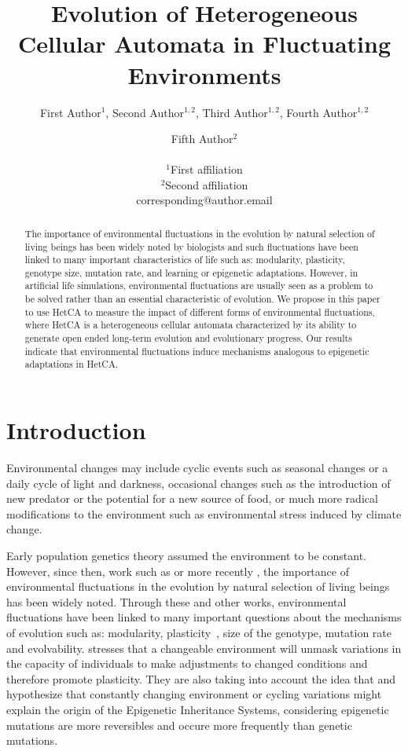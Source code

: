 \documentclass[letterpaper]{article}
\title{Evolution of Heterogeneous Cellular Automata in Fluctuating Environments}
\author{First Author$^{1}$, Second Author$^{1,2}$, Third Author$^{1,2}$, Fourth Author$^{1,2}$ \and Fifth Author$^2$ \\
\mbox{}\\
$^1$First affiliation  \\
$^2$Second affiliation \\
corresponding@author.email}
\begin{document}
\maketitle

\begin{abstract}
The importance of environmental fluctuations in the evolution by natural selection of living beings has been widely noted by biologists and such fluctuations have been linked to many important characteristics of life such as: modularity, plasticity, genotype size, mutation rate, and learning or epigenetic adaptations. However, in artificial life simulations, environmental fluctuations are usually seen as a problem to be solved rather than an essential characteristic of evolution. We propose in this paper to use HetCA to measure the impact of different forms of environmental fluctuations, where HetCA is a heterogeneous cellular automata characterized by its ability to generate open ended long-term evolution and evolutionary progress, Our results indicate that environmental fluctuations induce mechanisms analogous to epigenetic adaptations in HetCA.
\end{abstract}



\section{Introduction}\label{secintro}
Environmental changes may include cyclic events such as seasonal changes or a daily cycle of light and darkness, occasional changes such as the introduction of new predator or the potential for a new source of food, or much more radical modifications to the environment such as environmental stress induced by climate change.

Early population genetics theory assumed the environment to be constant. However, since then, work such as \citep{levins1968evolution} or more recently \citep{jablonka2014evolution}, the importance of environmental fluctuations in the evolution by natural selection of living beings has been widely noted. Through these and other works, environmental fluctuations have been linked to many important questions about the mechanisms of evolution such as: modularity, plasticity~\citep{west2005developmental}, size of the genotype, mutation rate and evolvability. \citep{jablonka2014evolution} stresses that a changeable environment will unmask variations in the capacity of individuals to make adjustments to changed conditions and therefore promote plasticity. They are also taking into account the idea that  and hypothesize that constantly changing environment or cycling variations might explain the origin of the Epigenetic Inheritance Systems, considering epigenetic mutations are more reversibles and occure more frequently than genetic mutations. 
\end{document}
